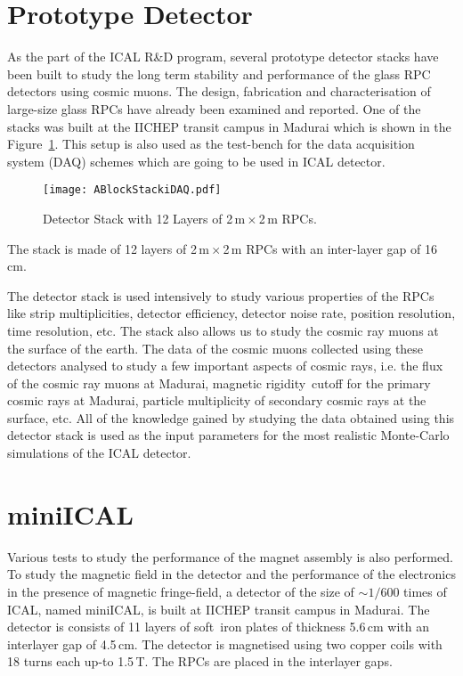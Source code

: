 \section{Prototype Detector}
As the part of the ICAL R\&D program, several prototype detector
stacks have been built to study the long term stability and
performance of the glass RPC detectors using cosmic muons. The design,
fabrication and characterisation of large-size glass RPCs have already
been examined and reported\cite{largerpc}. One of the stacks was built
at the IICHEP transit campus in Madurai which is shown in the
Figure~\ref{fig:ablock}. This setup is also used as the test-bench
for the data acquisition system (DAQ) schemes which are going to be
used in ICAL detector.
\begin{figure}[h]
  \centering
  \texttt{[image: ABlockStackiDAQ.pdf]}
  \caption{Detector Stack with 12 Layers of 2\,m\,$\times$\,2\,m RPCs.}
  \label{fig:ablock}
\end{figure}
The stack is made of 12 layers of 2\,m\,$\times$\,2\,m RPCs with an
inter-layer gap of 16\,cm.

The detector stack is used intensively to study various properties of
the RPCs like strip multiplicities, detector efficiency, detector
noise rate, position resolution, time resolution, etc. The stack also
allows us to study the cosmic ray muons at the surface of the earth.
The data of the cosmic muons collected using these detectors analysed
to study a few important aspects of cosmic rays, i.e. the flux of
the cosmic ray muons at Madurai\cite{pethu1}, magnetic rigidity~cutoff
for the primary cosmic rays at Madurai, particle multiplicity of
secondary cosmic rays at the surface, etc. All of the knowledge gained
by studying the data obtained using this detector stack is used as the
input parameters for the most realistic Monte-Carlo simulations of the
ICAL detector.

\section{miniICAL}
Various tests to study the performance of the magnet assembly is also
performed. To study the magnetic field in the detector and the
performance of the electronics in the presence of magnetic
fringe-field, a detector of the size of $\sim 1/600$ times of ICAL,
named miniICAL, is built at IICHEP transit campus in Madurai. The
detector is consists of 11 layers of soft~iron plates of thickness
5.6\,cm with an interlayer gap of 4.5\,cm. The detector is magnetised
using two copper coils with 18 turns each up-to 1.5\,T. The RPCs are
placed in the interlayer gaps.

